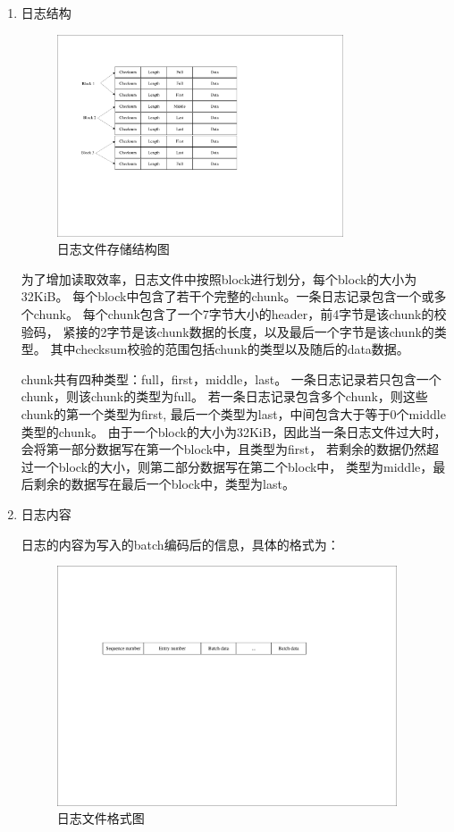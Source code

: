    \begin{enumerate}
   \item 日志结构

   \begin{figure}[H]
	   \centering
	   \includegraphics[width=0.80\textwidth]{pdf/journal.pdf}
	   \caption{日志文件存储结构图}
	   \label{journal}
   \end{figure}
   为了增加读取效率，日志文件中按照block进行划分，每个block的大小为32KiB。
   每个block中包含了若干个完整的chunk。一条日志记录包含一个或多个chunk。
   每个chunk包含了一个7字节大小的header，前4字节是该chunk的校验码，
   紧接的2字节是该chunk数据的长度，以及最后一个字节是该chunk的类型。
   其中checksum校验的范围包括chunk的类型以及随后的data数据。

   chunk共有四种类型：full，first，middle，last。
   一条日志记录若只包含一个chunk，则该chunk的类型为full。
   若一条日志记录包含多个chunk，则这些chunk的第一个类型为first, 
   最后一个类型为last，中间包含大于等于0个middle类型的chunk。
   由于一个block的大小为32KiB，因此当一条日志文件过大时，
   会将第一部分数据写在第一个block中，且类型为first，
   若剩余的数据仍然超过一个block的大小，则第二部分数据写在第二个block中，
   类型为middle，最后剩余的数据写在最后一个block中，类型为last。
   
   \item 日志内容
   
   日志的内容为写入的batch编码后的信息，具体的格式为：
   \begin{figure}[H]
	   \centering
	   \includegraphics[width=0.95\textwidth]{pdf/journal_content.pdf}
	   \caption{日志文件格式图}
	   \label{journal_content}
   \end{figure}


\end{enumerate}
